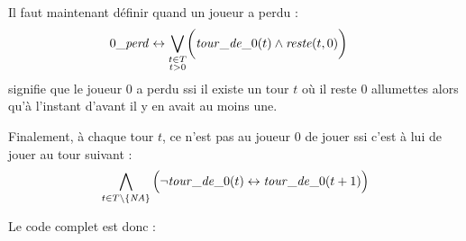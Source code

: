 Il faut maintenant définir quand un joueur a perdu :
\begin{gather}
\begin{split}
\lost \lequiv \bigvee_{\substack{t \in \turnsSet\\ t > 0}} & \bigg ( \turn{t} \land \rest{t}{0} %
\bigg )
\end{split}
\end{gather}
signifie que le joueur $0$ a perdu ssi il existe un tour $t$ où il reste $0$ allumettes alors qu'à l'instant d'avant il y en avait au moins une.

Finalement, à chaque tour $t$, ce n'est pas au joueur $0$ de jouer ssi c'est à lui de jouer au tour suivant :
\begin{gather}
\bigwedge_{t \in T \setminus \{ \mathit{NA} \} } \Big (
    \neg \mathit{tour\_de\_}0(t) \leftrightarrow \mathit{tour\_de\_}0(t+1)
\Big )
\label{eq:turnChange}
\end{gather}

\noindent
Le code \touist complet est donc :

